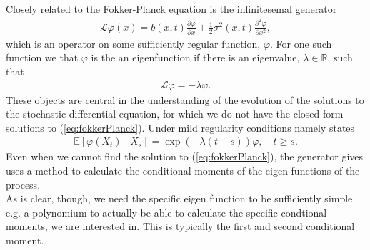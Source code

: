 Closely related to the Fokker-Planck equation is the infinitesemal generator 
\begin{align}
    \mathcal{L}\varphi(x) = b(x, t) \frac{\partial\varphi}{\partial x} + \frac{1}{2}\sigma^2(x, t)\frac{\partial^2\varphi}{\partial x^2} \label{eq:infinitesemalGeneratorDefinition},
\end{align}
which is an operator on some sufficiently regular function, $\varphi$. For one such function we that $\varphi$ is the an eigenfunction if there is an eigenvalue, $\lambda\in\mathbb{R}$, such that
\begin{align}
    \mathcal{L}\varphi = -\lambda\varphi.
\end{align} 
These objects are central in the understanding of the evolution of the solutions to the stochastic differential equation, for which we do not have the closed form solutions to (\ref{eq:fokkerPlanck}). Under mild regularity conditions \cite[theorem 1.16]{StatisticalMethodsForSDE} namely states
\begin{align}
    \mathbb{E}\left[\varphi(X_{t}) \middle | X_{s}\right] = \exp\left(-\lambda \left(t - s\right)\right)\varphi \label{eq:momentConditions}, \quad t\geq s.
\end{align}
Even when we cannot find the solution to (\ref{eq:fokkerPlanck}), the generator gives uses a method to calculate the conditional moments of the eigen functions of the process.\\
As is clear, though, we need the specific eigen function to be sufficiently simple e.g. a polynomium to actually be able to calculate the specific condtional moments, we are interested in. This is typically the first and second conditional moment.
